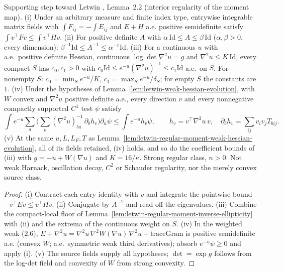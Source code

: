 \begin{lemma}
  \label{lem:letwin-regular-moment-directional-subsolution}
  \leanok
  Supporting step toward Letwin \cite{Letwin2026QuadraticKLS}, Lemma~2.2 (interior regularity of the moment map).
  (i) Under an arbitrary measure and finite index type, entrywise integrable matrix fields with $\int F_{ij}=-\int E_{ij}$ and $E+H$ a.e.
  positive semidefinite satisfy $\int v^{\top}Fv\le\int v^{\top}Hv$.
  (ii) For positive definite $A$ with $\alpha\,\mathrm{Id}\le A\le\beta\,\mathrm{Id}$ ($\alpha,\beta>0$, every dimension):
  $\beta^{-1}\mathrm{Id}\le A^{-1}\le\alpha^{-1}\mathrm{Id}$.
  (iii) For a continuous $u$ with a.e.\ positive definite Hessian, continuous $\log\det\nabla^2u=g$ and $\nabla^2u\le K\,\mathrm{Id}$, every compact
  $S$ has $c_0,c_1>0$ with $c_0\mathrm{Id}\le e^{-u}(\nabla^2u)^{-1}\le c_1\mathrm{Id}$ a.e.\ on $S$. For nonempty $S$:
  $c_0=\min_Se^{-u}/K$, $c_1=\max_Se^{-u}/\delta_S$; for empty $S$ the constants are $1$.
  (iv) Under the hypotheses of Lemma~\ref{lem:letwin-weak-hessian-evolution}, with $W$ convex and $\nabla^2u$ positive definite a.e., every
  direction $v$ and every nonnegative compactly supported $C^1$ test $\psi$ satisfy
  \[\int e^{-u}\sum_a\Big(\sum_b(\nabla^2u)^{-1}_{ba}\,\partial_bh_v\Big)\partial_a\psi\le\int e^{-u}h_v\psi,
    \qquad h_v=v^{\top}\nabla^2u\,v,\quad \partial_bh_v=\sum_{ij}v_iv_jT_{bij}.\]
  (v) At the same $u,L,L_F,T$ as Lemma~\ref{lem:letwin-regular-moment-weak-hessian-evolution}, all of its fields retained, (iv) holds, and so do
  the coefficient bounds of (iii) with $g=-u+W(\nabla u)$ and $K=16/\kappa$. Strong regular class, $n>0$. Not weak Harnack, oscillation
  decay, $C^{2}$ or Schauder regularity, nor the merely convex source class.
\end{lemma}
\begin{proof}
  \leanok
  (i) Contract each entry identity with $v$ and integrate the pointwise bound $-v^{\top}Ev\le v^{\top}Hv$. (ii) Conjugate by $A^{-1}$ and read off
  the eigenvalues. (iii) Combine the compact-local floor of Lemma~\ref{lem:letwin-regular-moment-inverse-ellipticity} with (ii) and the extrema
  of the continuous weight on $S$. (iv) In the weighted weak (2.6), $E+\nabla^2u=\nabla^2u\,\nabla^2W(\nabla u)\,\nabla^2u+\mathrm{traceGram}$ is
  positive semidefinite a.e. (convex $W$; a.e.\ symmetric weak third derivatives); absorb $e^{-u}\psi\ge0$ and apply (i). (v) The source fields
  supply all hypotheses; $\det=\exp g$ follows from the log-det field and convexity of $W$ from strong convexity.
\end{proof}

